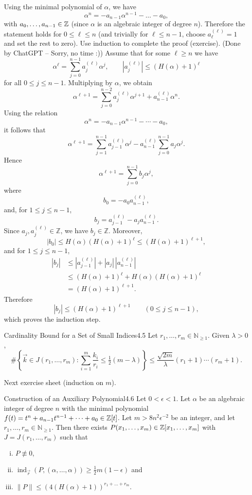 \documentclass{Vorlesungstemplate_English} %
\renewcommand{\N}{\mathbb{N}_{\geq 1}}
\begin{document}
\begin{pf}
  Using the minimal polynomial of $\alpha$, we have
  \[ \alpha^n = -a_{n-1}\alpha^{n-1} - \dots - a_0,\]
  with $a_0, \dots, a_{n-1} \in \mathbb{Z}$ (since $\alpha$ is an algebraic integer of degree $n$). Therefore the statement holds for $0 \leq \ell \leq n$ {\color{blue} (and trivially for $\ell \leq n-1$, choose $a^{(\ell)}_{\ell} = 1$ and set the rest to zero)}. Use induction to complete the proof (exercise).
  {\color{blue} (Done by ChatGPT -- Sorry, no time :)) Assume that for some $\ell \ge n$ we have
\[
\alpha^\ell=\sum_{j=0}^{n-1} a_j^{(\ell)}\alpha^j,
\qquad
|a_j^{(\ell)}|\le (H(\alpha)+1)^\ell
\]
for all $0\le j\le n-1$. Multiplying by $\alpha$, we obtain
\[
\alpha^{\ell+1}
=
\sum_{j=0}^{n-2} a_j^{(\ell)}\alpha^{j+1}
+
a_{n-1}^{(\ell)}\alpha^n.
\]
Using the relation
\[
\alpha^n=-a_{n-1}\alpha^{n-1}-\cdots-a_0,
\]
it follows that
\[
\alpha^{\ell+1}
=
\sum_{j=1}^{n-1} a_{j-1}^{(\ell)}\alpha^j
-
a_{n-1}^{(\ell)}
\sum_{j=0}^{n-1} a_j\alpha^j.
\]
Hence
\[
\alpha^{\ell+1}
=
\sum_{j=0}^{n-1} b_j \alpha^j,
\]
\color{blue} where
\[
b_0=-a_0a_{n-1}^{(\ell)},
\]
and, for $1\le j\le n-1$,
\[
b_j=a_{j-1}^{(\ell)}-a_j a_{n-1}^{(\ell)}.
\]
Since $a_j,a_j^{(\ell)}\in\mathbb Z$, we have $b_j\in\mathbb Z$. Moreover,
\[
|b_0|
\le
H(\alpha)(H(\alpha)+1)^\ell
\le
(H(\alpha)+1)^{\ell+1},
\]
and for $1\le j\le n-1$,
\[
\begin{aligned}
|b_j|
&\le
|a_{j-1}^{(\ell)}|
+
|a_j|\,|a_{n-1}^{(\ell)}| \\
&\le
(H(\alpha)+1)^\ell
+
H(\alpha)(H(\alpha)+1)^\ell \\
&=
(H(\alpha)+1)^{\ell+1}.
\end{aligned}
\]
Therefore
\[
|b_j|\le (H(\alpha)+1)^{\ell+1}
\qquad (0\le j\le n-1),
\]
which proves the induction step.}
\end{pf}
\begin{lemma}{Cardinality Bound for a Set of Small Indices}{4.5}
  Let $r_1, \dots, r_m \in \N$. Given $\lambda > 0$,
  \[ \#\left\{ \vec k \in J(r_1, \dots, r_m): \sum_{i=1}^m\frac{k_i}{r_i} \leq \tfrac{1}{2}(m-\lambda)\right\} \leq \frac{\sqrt{2m}}{\lambda}(r_1+1)\cdots(r_m+1).\]
\end{lemma}
\begin{pf}
  Next exercise sheet (induction on $m$).
\end{pf}
\begin{theorem}{Construction of an Auxiliary Polynomial}{4.6}
  Let $0 < \epsilon < 1$. Let $\alpha$ be an algebraic integer of degree $n$ with the minimal polynomial $f(t) = t^n + a_{n-1}t^{n-1} + \dots + a_0 \in \mathbb{Z}[t]$. Let $m > 8n^2\epsilon^{-2}$ be an integer, and let $r_1, \dots, r_m \in \N$. Then there exists $P(x_1, \dots, x_m) \in \mathbb{Z}[x_1, \dots, x_m]$ with $J = J(r_1, \dots, r_m)$ such that
  \begin{enumerate}[(i)]
    \item $P \not\equiv 0$,
    \item $\operatorname{ind}_{\vec r}(P, (\alpha, \dots, \alpha)) \geq \tfrac{1}{2}m(1-\epsilon)$ and
    \item $\|P\| \leq (4(H(\alpha)+1))^{r_1 + \dots + r_m}$.
  \end{enumerate}
\end{theorem}
\end{document}
